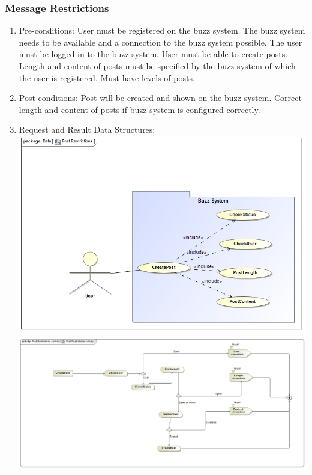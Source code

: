 \documentclass[hidelinks, 12pt, oneside]{article}
\begin{document}
\subsubsection{Message Restrictions}
\begin{enumerate}
 \item Pre-conditions:  User must be registered on the buzz system. The buzz system needs to be available and a connection to the buzz system possible. The user must be logged in to the buzz system. User must be able to create posts. Length and content of posts must be specified by the buzz system of which the user is registered. Must have levels of posts.
 
 \item Post-conditions: Post will be created and shown on the buzz system. Correct length and content of posts if buzz system is configured correctly.
   \\
 \item Request and Result Data Structures:\\
  \includegraphics[scale=0.4]{PostRestrictions}\\
 \includegraphics[scale=0.35]{PostRestrictionsActivity} 
\end{enumerate}
\end{document}
